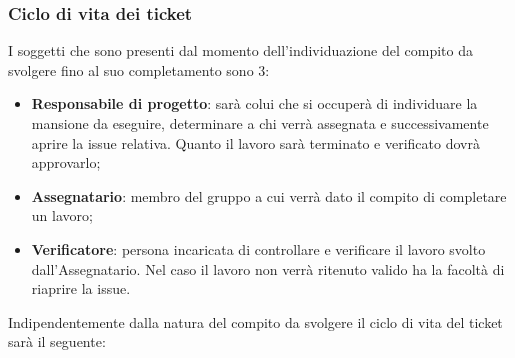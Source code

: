 		\subsubsection{Ciclo di vita dei ticket}
			I soggetti che sono presenti dal momento dell’individuazione del compito da svolgere fino al suo completamento sono 3:
			\begin{itemize}
				\item\textbf{Responsabile di progetto}: sarà colui che si occuperà di individuare la mansione da eseguire, determinare a chi verrà assegnata e successivamente aprire la issue relativa. Quanto il lavoro sarà terminato e verificato dovrà approvarlo;
				\item\textbf{Assegnatario}: membro del gruppo a cui verrà dato il compito di completare un lavoro;
				\item\textbf{Verificatore}: persona incaricata di controllare e verificare il lavoro svolto dall'Assegnatario. Nel caso il lavoro non verrà ritenuto valido ha la facoltà di riaprire la issue.
			\end{itemize}
			Indipendentemente dalla natura del compito da svolgere il ciclo di vita del ticket sarà il seguente:
